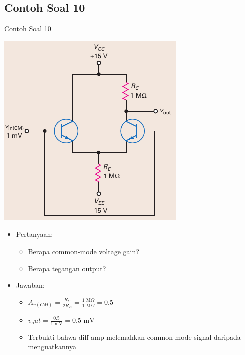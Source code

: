 \documentclass[aspectratio=169]{beamer}
\begin{document}
\subsection{Contoh Soal 10}
\begin{frame}{Contoh Soal 10}
	\begin{multicols}{2}
		\begin{center}
			\includegraphics[width=\linewidth, height=0.7\textheight]{gambar/01.diff-amp/01.fig21}
		\end{center}
		\columnbreak
		\begin{itemize}
			\item Pertanyaan:
			\begin{itemize}
				\item Berapa common-mode voltage gain?
				\item Berapa tegangan output?
			\end{itemize}
			\item Jawaban:
			\begin{itemize}
				\item $ A_{v(CM)} = \frac{R_C}{2R_E} = \frac{1 \text{ M}\Omega}{1 \text{ M}\Omega} = 0.5 $
				\item $ v_out = \frac{0.5}{1 \text{ mV}} = 0.5 \text{ mV} $
				\item Terbukti bahwa diff amp melemahkan common-mode signal daripada menguatkannya
			\end{itemize}
		\end{itemize}
	\end{multicols}
\end{frame}
\end{document}
